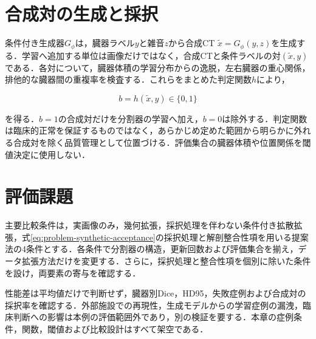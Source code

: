 \section{合成対の生成と採択}

条件付き生成器$G_{\phi}$は，臓器ラベル$y$と雑音$z$から合成CT $\tilde{x}=G_{\phi}(y,z)$を生成する．学習へ追加する単位は画像だけではなく，合成CTと条件ラベルの対$(\tilde{x},y)$である．各対について，臓器体積の学習分布からの逸脱，左右臓器の重心関係，排他的な臓器間の重複率を検査する．これらをまとめた判定関数$h$により，

\begin{equation}
  b=h(\tilde{x},y)\in\{0,1\}
  \label{eq:problem-synthetic-acceptance}
\end{equation}

を得る．$b=1$の合成対だけを分割器の学習へ加え，$b=0$は除外する．判定関数は臨床的正常を保証するものではなく，あらかじめ定めた範囲から明らかに外れる合成対を除く品質管理として位置づける．評価集合の臓器体積や位置関係を閾値決定に使用しない．

\section{評価課題}

主要比較条件は，実画像のみ，幾何拡張，採択処理を伴わない条件付き拡散拡張，式\eqref{eq:problem-synthetic-acceptance}の採択処理と解剖整合性項を用いる提案法の4条件とする．各条件で分割器の構造，更新回数および評価集合を揃え，データ拡張方法だけを変更する．さらに，採択処理と整合性項を個別に除いた条件を設け，両要素の寄与を確認する．

性能差は平均値だけで判断せず，臓器別Dice，HD95，失敗症例および合成対の採択率を確認する．外部施設での再現性，生成モデルからの学習症例の漏洩，臨床判断への影響は本例の評価範囲外であり，別の検証を要する．本章の症例条件，関数，閾値および比較設計はすべて架空である．
